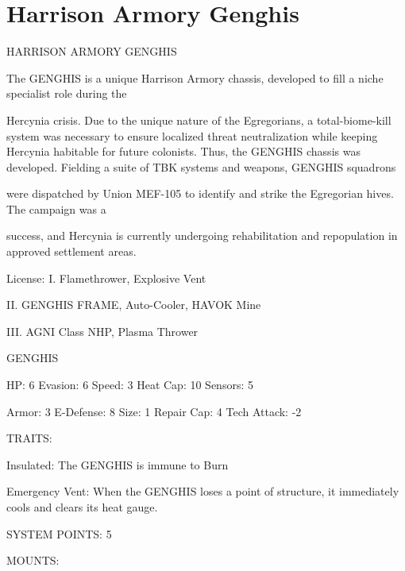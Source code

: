 \section{Harrison Armory Genghis}
                                                              
                                  HARRISON ARMORY GENGHIS  

The GENGHIS is a unique Harrison Armory chassis, developed to fill a niche specialist role during the  

Hercynia crisis. Due to the unique nature of the Egregorians, a total-biome-kill system was necessary to  
ensure localized threat neutralization while keeping Hercynia habitable for future colonists. Thus, the  
GENGHIS chassis was developed. Fielding a suite of TBK systems and weapons, GENGHIS squadrons  

were dispatched by Union MEF-105 to identify and strike the Egregorian hives. The campaign was a  

success, and Hercynia is currently undergoing rehabilitation and repopulation in approved settlement areas.    

                                                       License:   
I. Flamethrower, Explosive Vent
 
II. GENGHIS FRAME, Auto-Cooler, HAVOK Mine
 
III. AGNI Class NHP, Plasma Thrower
 

                                                                                                                    


                                                GENGHIS 

HP: 6          Evasion: 6                            Speed: 3            Heat Cap: 10       Sensors: 5 

Armor: 3       E-Defense: 8                          Size: 1             Repair Cap: 4      Tech Attack: -2 

                                                  TRAITS: 

Insulated: The GENGHIS is immune to Burn
 
Emergency Vent: When the GENGHIS loses a point of structure, it immediately cools and clears its  
heat gauge. 

                                            SYSTEM POINTS: 5 

                                                 MOUNTS: 

